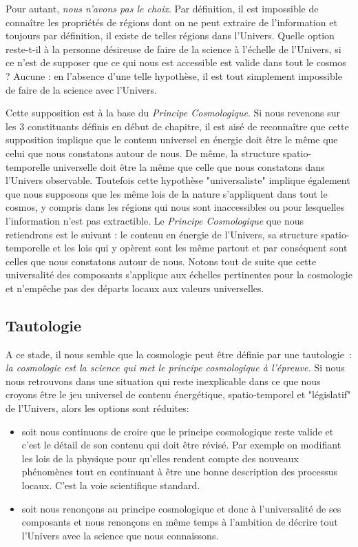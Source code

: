 Pour autant, \textit{nous n'avons pas le choix}. Par définition, il est impossible de connaître les propriétés de régions dont on ne peut extraire de l'information et toujours par définition, il existe de telles régions dans l'Univers. Quelle option reste-t-il à la personne désireuse de faire de la science à l'échelle de l'Univers, si ce n'est de supposer que ce qui nous est accessible est valide dans tout le cosmos ? Aucune : en l'absence d'une telle hypothèse, il est tout simplement impossible de faire de la science avec l'Univers.

Cette supposition est à la base du \textit{Principe Cosmologique}. Si nous revenons sur les 3 constituants définis en début de chapitre, il est aisé de reconnaître que cette supposition implique que le contenu universel en énergie doit être le même que celui que nous constatons autour de nous. De même, la structure spatio-temporelle universelle doit être la même que celle que nous constatons dans l'Univers observable. Toutefois cette hypothèse "universaliste" implique également que nous supposons que les même lois de la nature s'appliquent dans tout le cosmos, y compris dans les régions qui nous sont inaccessibles ou pour lesquelles l'information n'est pas extractible. Le \textit{Principe Cosmologique} que nous retiendrons est le suivant : le contenu en énergie de l'Univers, sa structure spatio-temporelle et les lois qui y opèrent sont les même partout et par conséquent sont celles que nous constatons autour de nous. Notons tout de suite que cette universalité des composants s'applique aux échelles pertinentes pour la cosmologie et n'empêche pas des départs locaux aux valeurs universelles.

\subsection{Tautologie}

A ce stade, il nous semble que la cosmologie peut être définie par une tautologie~: \textit{la cosmologie est la science qui met le principe cosmologique à l'épreuve.} Si nous nous retrouvons dans une situation qui reste inexplicable dans ce que nous croyons être le jeu universel de contenu énergétique, spatio-temporel et "législatif" de l'Univers, alors les options sont réduites:
\begin{itemize}
\item soit nous continuons de croire que le principe cosmologique reste valide et c'est le détail de son contenu qui doit être révisé. Par exemple on modifiant les lois de la physique pour qu'elles rendent compte des nouveaux phénomènes tout en continuant à être une bonne description des processus locaux. C'est la voie scientifique standard.
\item soit nous renonçons au principe cosmologique et donc à l'universalité de ses composants et nous renonçons en même temps à l'ambition de décrire tout l'Univers avec la science que nous connaissons.
\end{itemize}

